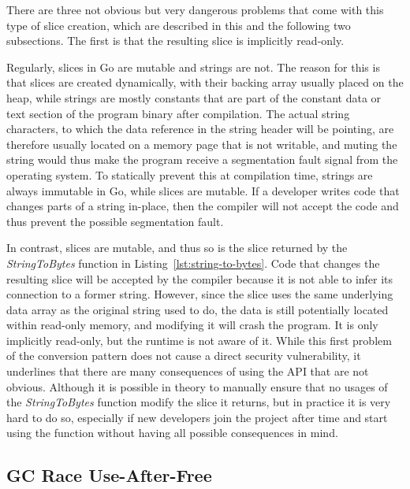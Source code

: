 There are three not obvious but very dangerous problems that come with this type of slice creation, which are described
in this and the following two subsections.
The first is that the resulting slice is implicitly read-only.

Regularly, slices in Go are mutable and strings are not.
The reason for this is that slices are created dynamically, with their backing array usually placed on the heap, while
strings are mostly constants that are part of the constant data or text section of the program binary after compilation.
The actual string characters, to which the data reference in the string header will be pointing, are therefore usually
located on a memory page that is not writable, and muting the string would thus make the program receive a segmentation
fault signal from the operating system.
To statically prevent this at compilation time, strings are always immutable in Go, while slices are mutable.
If a developer writes code that changes parts of a string in-place, then the compiler will not accept the code and thus
prevent the possible segmentation fault.

In contrast, slices are mutable, and thus so is the slice returned by the \textit{StringToBytes} function in
Listing~\ref{lst:string-to-bytes}.
Code that changes the resulting slice will be accepted by the compiler because it is not able to infer its connection to
a former string.
However, since the slice uses the same underlying data array as the original string used to do, the data is still
potentially located within read-only memory, and modifying it will crash the program.
It is only implicitly read-only, but the runtime is not aware of it.
While this first problem of the conversion pattern does not cause a direct security vulnerability, it underlines that
there are many consequences of using the \unsafe{} \acrshort{API} that are not obvious.
Although it is possible in theory to manually ensure that no usages of the \textit{StringToBytes} function modify the
slice it returns, but in practice it is very hard to do so, especially if new developers join the project after time and
start using the function without having all possible consequences in mind.



\subsection{GC Race Use-After-Free}\label{subsec:unsafe-security-problems:slice-casts:gc-race}

